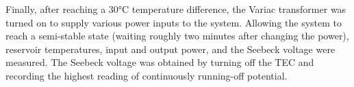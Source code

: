 \begin{paper}
	\vspace{2em}


	Finally, after reaching a \( 30 \si{\celsius} \) temperature difference, the Variac transformer was turned on to supply various power inputs to the system. Allowing the system to reach a semi-stable state (waiting roughly two minutes after changing the power), reservoir temperatures, input and output power, and the Seebeck voltage were measured. The Seebeck voltage was obtained by turning off the TEC and recording the highest reading of continuously running-off potential. 


\end{paper}
